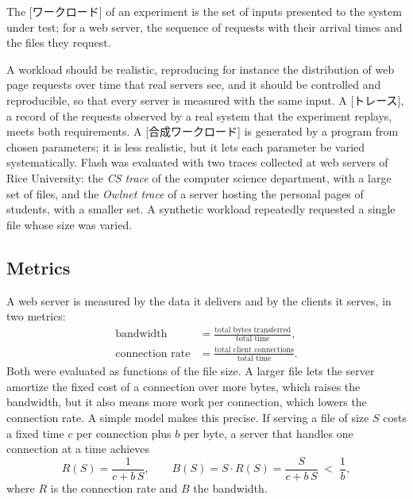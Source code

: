 \documentclass[../main.tex]{subfiles}
\begin{document}
\begin{definition}[Workload]
  The [ワークロード] of an experiment is the set of inputs
  presented to the system under test; for a web server, the sequence of
  requests with their arrival times and the files they request.
\end{definition}

A workload should be realistic, reproducing for instance the distribution
of web page requests over time that real servers see, and it should be
controlled and reproducible, so that every server is measured with the same
input.  A [トレース], a record of the requests observed by a
real system that the experiment replays, meets both requirements.  A
[合成ワークロード] is generated by a program from
chosen parameters; it is less realistic, but it lets each parameter be
varied systematically.  Flash was evaluated with two traces collected at
web servers of Rice University: the \emph{CS trace} of the computer science
department, with a large set of files, and the \emph{Owlnet trace} of a
server hosting the personal pages of students, with a smaller set.  A
synthetic workload repeatedly requested a single file whose size was varied.

\subsection{Metrics}

A web server is measured by the data it delivers and by the clients it
serves, in two metrics:
\begin{equation}
  \begin{aligned}
    \text{bandwidth} &= \frac{\text{total bytes transferred}}{\text{total time}} ,\\[1mm]
    \text{connection rate} &= \frac{\text{total client connections}}{\text{total time}} .
  \end{aligned}
  \label{eq:l06-bandwidth}
\end{equation}
Both were evaluated as functions of the file size.  A larger file lets the
server amortize the fixed cost of a connection over more bytes, which raises
the bandwidth, but it also means more work per connection, which lowers the
connection rate.  A simple model makes this precise.  If serving a file of
size $S$ costs a fixed time $c$ per connection plus $b$ per byte, a server
that handles one connection at a time achieves
\begin{equation}
  R(S) = \frac{1}{c + b\,S} ,
  \qquad
  B(S) = S \cdot R(S) = \frac{S}{c + b\,S} \;<\; \frac{1}{b} ,
  \label{eq:l06-amortize}
\end{equation}
where $R$ is the connection rate and $B$ the bandwidth.
\end{document}

